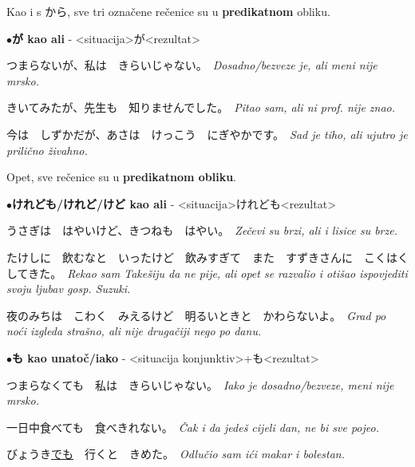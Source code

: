 \documentclass[12pt]{article}
\begin{document}
	\vspace{5pt}
	Kao i s から, sve tri označene rečenice su u \textbf{predikatnom} obliku.
	
	\vspace{5pt}
	\noindent
	$\bullet$\textbf{が kao ali} - <situacija>が<rezultat>
	\vspace{5pt}
	
	つまらないが、私は　きらいじゃない。　\textit{Dosadno/bezveze je, ali meni nije mrsko.}
	
	きいてみたが、先生も　知りませんでした。　\textit{Pitao sam, ali ni prof. nije znao.}
	
	今は　しずかだが、あさは　けっこう　にぎやかです。　\textit{Sad je tiho, ali ujutro je prilično živahno.}
	
	\vspace{5pt}
	Opet, sve rečenice su u \textbf{predikatnom obliku}.
	
	\vspace{5pt}
	\noindent
	$\bullet$\textbf{けれども/けれど/けど kao ali} - <situacija>けれども<rezultat>
	\vspace{5pt}
	
	うさぎは　はやいけど、きつねも　はやい。　\textit{Zečevi su brzi, ali i lisice su brze.}
	
	たけしに　飲むなと　いったけど　飲みすぎて　また　すずきさんに　こくはくしてきた。　\textit{Rekao sam Takešiju da ne pije, ali opet se razvalio i otišao ispovjediti svoju ljubav gosp. Suzuki.}
	
	夜のみちは　こわく　みえるけど　明るいときと　かわらないよ。　\textit{Grad po noći izgleda strašno, ali nije drugačiji nego po danu.}
	
	
	\newpage
	\vspace{5pt}
	\noindent
	$\bullet$\textbf{も kao unatoč/iako} - <situacija konjunktiv>+も<rezultat>
	\vspace{5pt}
	
	つまらなくても　私は　きらいじゃない。　\textit{Iako je dosadno/bezveze, meni nije mrsko.}
	
	一日中食べても　食べきれない。　\textit{Čak i da jedeš cijeli dan, ne bi sve pojeo.}
	
	びょうき\underline{でも}　行くと　きめた。　\textit{Odlučio sam ići makar i bolestan.}
	
\end{document}

